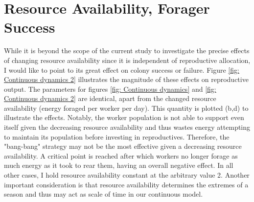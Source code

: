 \documentclass[12pt]{report}
\begin{document}
\section*{Resource Availability, Forager Success}
While it is beyond the scope of the current study to investigate the precise effects of changing resource availability since it is independent of reproductive allocation, I would like to point to its great effect on colony success or failure. Figure \ref{fig: Continuous dynamics 2} illustrates the magnitude of these effects on reproductive output. The parameters for figures \ref{fig: Continuous dynamics} and \ref{fig: Continuous dynamics 2} are identical, apart from the changed resource availability (energy foraged per worker per day). This quantity is plotted (b,d) to illustrate the effects. Notably, the worker population is not able to support even itself given the decreasing resource availability and thus wastes energy attempting to maintain its population before investing in reproductives. Therefore, the "bang-bang" strategy may not be the most effective given a decreasing resource availability. A critical point is reached after which workers no longer forage as much energy as it took to rear them, having an overall negative effect. In all other cases, I hold resource availability constant at the arbitrary value 2. Another important consideration is that resource availability determines the extremes of a season and thus may act as scale of time in our continuous model. 


\end{document}
